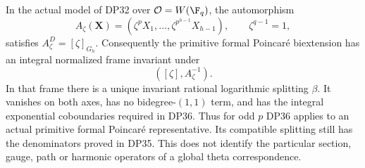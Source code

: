 \begin{proposition}\label{DP37}
In the actual model of DP32 over $\mathcal O=W(\F_q)$, the automorphism
\[
 A_\zeta(\mathbf X)=(\zeta^pX_1,\ldots,\zeta^{p^{h-1}}X_{h-1}),\qquad\zeta^{q-1}=1,
\]
satisfies $A_\zeta^D=[\zeta]_{G_h}$. Consequently the primitive formal Poincar\'e biextension has an integral normalized frame invariant under
\[
 ([\zeta],A_\zeta^{-1}).
\]
In that frame there is a unique invariant rational logarithmic splitting $\beta$. It vanishes on both axes, has no bidegree-$(1,1)$ term, and has the integral exponential coboundaries required in DP36. Thus for odd $p$ DP36 applies to an actual primitive formal Poincar\'e representative. Its compatible splitting still has the denominators proved in DP35. This does not identify the particular section, gauge, path or harmonic operators of a global theta correspondence.
\end{proposition}
